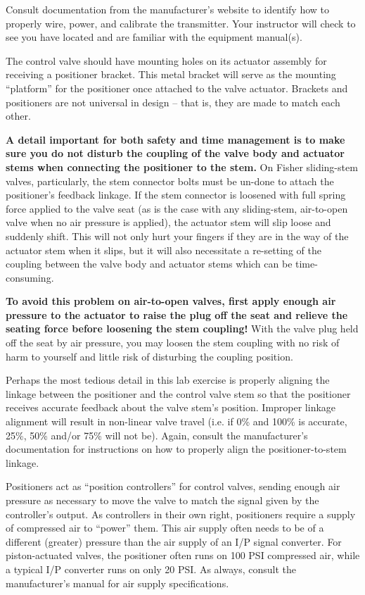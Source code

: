 Consult documentation from the manufacturer's website to identify how to properly wire, power, and calibrate the transmitter.  Your instructor will check to see you have located and are familiar with the equipment manual(s).

The control valve should have mounting holes on its actuator assembly for receiving a positioner bracket.  This metal bracket will serve as the mounting ``platform'' for the positioner once attached to the valve actuator.  Brackets and positioners are not universal in design -- that is, they are made to match each other.

\vskip 10pt

{\bf A detail important for both safety and time management is to make sure you do not disturb the coupling of the valve body and actuator stems when connecting the positioner to the stem.}  On Fisher sliding-stem valves, particularly, the stem connector bolts must be un-done to attach the positioner's feedback linkage.  If the stem connector is loosened with full spring force applied to the valve seat (as is the case with any sliding-stem, air-to-open valve when no air pressure is applied), the actuator stem will slip loose and suddenly shift.  This will not only hurt your fingers if they are in the way of the actuator stem when it slips, but it will also necessitate a re-setting of the coupling between the valve body and actuator stems which can be time-consuming.

{\bf To avoid this problem on air-to-open valves, first apply enough air pressure to the actuator to raise the plug off the seat and relieve the seating force before loosening the stem coupling!}  With the valve plug held off the seat by air pressure, you may loosen the stem coupling with no risk of harm to yourself and little risk of disturbing the coupling position.

Perhaps the most tedious detail in this lab exercise is properly aligning the linkage between the positioner and the control valve stem so that the positioner receives accurate feedback about the valve stem's position.  Improper linkage alignment will result in non-linear valve travel (i.e. if 0\% and 100\% is accurate, 25\%, 50\% and/or 75\% will not be).  Again, consult the manufacturer's documentation for instructions on how to properly align the positioner-to-stem linkage.

\vskip 10pt

Positioners act as ``position controllers'' for control valves, sending enough air pressure as necessary to move the valve to match the signal given by the controller's output.  As controllers in their own right, positioners require a supply of compressed air to ``power'' them.  This air supply often needs to be of a different (greater) pressure than the air supply of an I/P signal converter.  For piston-actuated valves, the positioner often runs on 100 PSI compressed air, while a typical I/P converter runs on only 20 PSI.  As always, consult the manufacturer's manual for air supply specifications.

